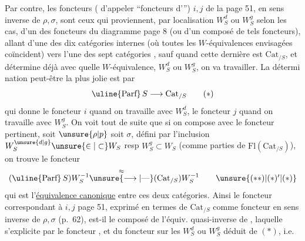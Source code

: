 Par contre, les foncteurs ( d'appeler ``foncteurs d''') $i,j$ de la page 51, en sens inverse de $\rho,\sigma$, sont ceux qui proviennent, par localisation $W_S^d$ ou $W_S^g$ selon les cas, d'un des foncteurs du diagramme page 8 (ou d'un composé de tels foncteurs), allant d'une des dix catégories internes (où toutes les $W$-équivalences envisagées coïncident) vers l'une des sept catégories , sauf quand cette dernière est $\mathrm{Cat}_{/S}$, et détermine déjà avec quelle $W$-équivalence, $W_S^d$ ou $W_S^g$, on va travailler. La détermi%
%
nation peut-être la plus jolie est par
\[
 \text{\uline{Parf}}\,S\longrightarrow\mathrm{Cat}_{/S}
 \tag*{$(*)$}
\]
qui donne le foncteur $i$ quand on travaille avec $W_S^d$, le foncteur $j$ quand on travaille avec $W_S^g$. On voit  tout de suite que si on compose avec le foncteur pertinent, soit $\unsure{\rho|p}$ soit $\sigma$, défini par l'inclusion $W_S^{\unsure{d|g}}\unsure{\in|\subset}W_S$ resp $W_S^g\subset W_S$ (comme parties de $\mathrm{Fl}(\mathrm{Cat}_{/S})$), on trouve le foncteur 
\[
 (\text{\uline{Parf}}\,S)W_S^{-1}\overset{\approx}{\unsure{\longrightarrow|\text{---}}}(\mathrm{Cat}_{/S})W_S^{-1}
 \tag*{$\unsure{(**)|(*)'|(*)}$}
\]
qui est l'\uline{équivalence canonique} entre ces deux catégories. Ainsi le  foncteur correspondant à $i,j$ page 51, exprimé en termes de $\mathrm{Cat}_{/S}$ comme foncteur en sens inverse de $\rho,\sigma$ (p.~62), est-il le composé de l'équiv. quasi-inverse de \unsure{$(**)$}, laquelle s'explicite par le foncteur , et du foncteur sur les  $W_S^d$ ou $W_S^g$ déduit de $(*)$, i.e.
